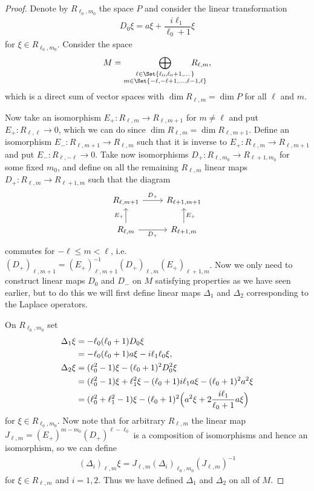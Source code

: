 \begin{proof}
  Denote by $R_{\ell_0,m_0}$ the space $P$ and consider the linear transformation
  \begin{align*}
    D_0 \xi = a\xi + \dfrac{i\ell_1}{\ell_0+1}\xi
  \end{align*}
  for $\xi\in R_{\ell_0,m_0}$. Consider the space
  \begin{align*}
    M = \bigoplus_{\substack{\ell\in\Set{\ell_0,\ell_0+1,\dotsc} \\ m\in\Set{-\ell,-\ell+1,\dotsc,\ell-1,\ell}}} \!\!\!\!\!\!\!\!\!\!\!\! R_{\ell,m},
  \end{align*}
  which is a direct sum of vector spaces with $\dim R_{\ell,m} = \dim P$ for all $\ell$ and $m$.

  Now take an isomorphism $E_+\colon R_{\ell,m}\to R_{\ell,m+1}$ for $m\neq \ell$ and put $E_+\colon R_{\ell,\ell}\to 0$, which we can do since $\dim R_{\ell,m}=\dim R_{\ell,m+1}$. Define an isomorphism $E_-\colon R_{\ell,m+1}\to R_{\ell,m}$ such that it is inverse to $E_+\colon R_{\ell,m}\to R_{\ell,m+1}$ and put $E_-\colon R_{\ell,-\ell}\to 0$. Take now isomorphisms $D_+\colon R_{\ell,m_0}\to R_{\ell+1,m_0}$ for some fixed $m_0$, and define on all the remaining $R_{\ell,m}$ linear maps $D_+\colon R_{\ell,m}\to R_{\ell+1,m}$ such that the diagram
  \[
    \begin{tikzcd}
      R_{\ell,m+1} \ar[r,"D_+"] & R_{\ell+1,m+1} \\
      R_{\ell,m}\ar[u,"E_+"] \ar[r,"D_+",swap] & R_{\ell+1,m}\ar[u,"E_+",swap]
    \end{tikzcd}
  \]
  commutes for $-\ell\leq m<\ell$, i.e.\ $(D_+)_{\ell,m+1}=(E_+)_{\ell,m+1}^{-1} (D_+)_{\ell,m} (E_+)_{\ell+1,m}$. Now we only need to construct linear maps $D_0$ and $D_-$ on $M$ satisfying properties as we have seen earlier, but to do this we will first define linear maps $\Delta_1$ and $\Delta_2$ corresponding to the Laplace operators.

  On $R_{\ell_0,m_0}$ set 
  \begin{align}
    \begin{aligned}
      \Delta_1 \xi &= -\ell_0(\ell_0+1)D_0\xi \\
      &= -\ell_0(\ell_0+1)a\xi - i\ell_1\ell_0\xi, \\
      \Delta_2 \xi &= (\ell_0^2-1)\xi - (\ell_0+1)^2D_0^2\xi \\
      &= (\ell_0^2-1)\xi + \ell_1^2\xi - (\ell_0+1)i\ell_1a\xi - (\ell_0+1)^2a^2\xi \\
      &= (\ell_0^2+\ell_1^2-1)\xi - (\ell_0+1)^2\Bigl( a^2\xi + 2\dfrac{i\ell_1}{\ell_0+1}a\xi \Bigr)
    \end{aligned}
  \end{align}
  for $\xi \in R_{\ell_0,m_0}$. Now note that for arbitrary $R_{\ell,m}$ the linear map $J_{\ell,m}=(E_+)^{m-m_0}(D_+)^{\ell-\ell_0}$ is a composition of isomorphisms and hence an isomorphism, so we can define 
  \begin{align*}
    (\Delta_i)_{\ell,m}\xi = J_{\ell,m}(\Delta_i)_{\ell_0,m_0} (J_{\ell,m})^{-1}
  \end{align*}
  for $\xi\in R_{\ell,m}$ and $i=1,2$. Thus we have defined $\Delta_1$ and $\Delta_2$ on all of $M$.
  

\end{proof}
